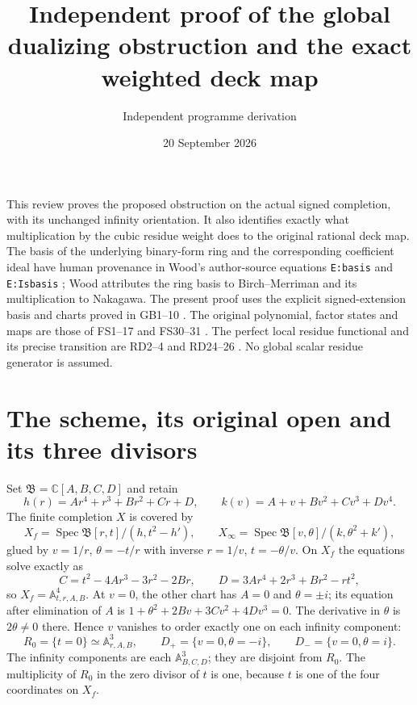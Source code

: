 \documentclass[10pt]{article}
\title{Independent proof of the global dualizing obstruction and the exact weighted deck map}
\author{Independent programme derivation}
\date{20 September 2026}
\newcommand{\C}{\mathbb C}
\newcommand{\Spec}{\operatorname{Spec}}
\begin{document}
\maketitle

This review proves the proposed obstruction on the actual signed
completion, with its unchanged infinity orientation. It also identifies
exactly what multiplication by the cubic residue weight does to the
original rational deck map. The basis of the underlying binary-form
ring and the corresponding coefficient ideal have human provenance
in Wood's author-source equations \texttt{E:basis} and
\texttt{E:Isbasis} \cite{Wood}; Wood attributes the ring basis to
Birch--Merriman and its multiplication to Nakagawa. The present
proof uses the explicit signed-extension basis and charts proved in
GB1--10 \cite{GB}. The original polynomial, factor states and maps
are those of FS1--17 and FS30--31 \cite{FS}. The perfect local
residue functional and its precise transition are RD2--4 and
RD24--26 \cite{RD}. No global scalar residue generator is assumed.

\section{The scheme, its original open and its three divisors}
Set $\mathfrak B=\C[A,B,C,D]$ and retain
\begin{equation}
 h(r)=Ar^4+r^3+Br^2+Cr+D,\qquad
 k(v)=A+v+Bv^2+Cv^3+Dv^4 .
 \tag{GDR1}
\end{equation}
The finite completion $X$ is covered by
\[
 X_f=\Spec\mathfrak B[r,t]/(h,t^2-h'),\qquad
 X_\infty=\Spec\mathfrak B[v,\theta]/(k,\theta^2+k'),
\]
glued by $v=1/r$, $\theta=-t/r$ with inverse $r=1/v$,
$t=-\theta/v$. On $X_f$ the equations solve exactly as
\[
 C=t^2-4Ar^3-3r^2-2Br,\qquad
 D=3Ar^4+2r^3+Br^2-rt^2,
\]
so $X_f=\mathbb A^4_{t,r,A,B}$. At $v=0$, the other chart
has $A=0$ and $\theta=\pm i$; its equation after elimination
of $A$ is $1+\theta^2+2Bv+3Cv^2+4Dv^3=0$.
The derivative in $\theta$ is $2\theta\ne0$ there. Hence $v$
vanishes to order exactly one on each infinity component:
\begin{equation}
 R_0=\{t=0\}\simeq\mathbb A^3_{r,A,B},\qquad
 D_+=\{v=0,\theta=-i\},\qquad D_-=\{v=0,\theta=i\}.
 \tag{GDR2}
\end{equation}
The infinity components are each $\mathbb A^3_{B,C,D}$;
they are disjoint from $R_0$. The multiplicity of $R_0$ in
the zero divisor of $t$ is one, because $t$ is one of the
four coordinates on $X_f$.
\end{document}
